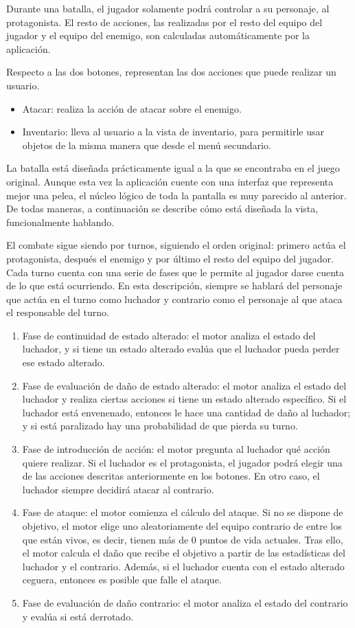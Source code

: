 Durante una batalla, el jugador solamente podrá controlar a su personaje, al protagonista. El resto de acciones, las realizadas por el resto del equipo del jugador y el equipo del enemigo, son calculadas automáticamente por la aplicación. 

Respecto a las dos botones, representan las dos acciones que puede realizar un usuario.
\begin{itemize}
	\item Atacar: realiza la acción de atacar sobre el enemigo.
	\item Inventario: lleva al usuario a la vista de inventario, para permitirle usar objetos de la misma manera que desde el menú secundario.
\end{itemize}

La batalla está diseñada prácticamente igual a la que se encontraba en el juego original. Aunque esta vez la aplicación cuente con una interfaz que representa mejor una pelea, el núcleo lógico de toda la pantalla es muy parecido al anterior. De todas maneras, a continuación se describe cómo está diseñada la vista, funcionalmente hablando. 

El combate sigue siendo por turnos, siguiendo el orden original: primero actúa el protagonista, después el enemigo y por último el resto del equipo del jugador. Cada turno cuenta con una serie de fases que le permite al jugador darse cuenta de lo que está ocurriendo. En esta descripción, siempre se hablará del personaje que actúa en el turno como luchador y contrario como el personaje al que ataca el responsable del turno.

\begin{enumerate}
	\item Fase de continuidad de estado alterado: el motor analiza el estado del luchador, y si tiene un estado alterado evalúa que el luchador pueda perder ese estado alterado.
	\item Fase de evaluación de daño de estado alterado: el motor analiza el estado del luchador y realiza ciertas acciones si tiene un estado alterado específico. Si el luchador está envenenado, entonces le hace una cantidad de daño al luchador; y si está paralizado hay una probabilidad de que pierda su turno.
	\item Fase de introducción de acción: el motor pregunta al luchador qué acción quiere realizar. Si el luchador es el protagonista, el jugador podrá elegir una de las acciones descritas anteriormente en los botones. En otro caso, el luchador siempre decidirá atacar al contrario.
	\item Fase de ataque: el motor comienza el cálculo del ataque. Si no se dispone de objetivo, el motor elige uno aleatoriamente del equipo contrario de entre los que están vivos, es decir, tienen más de 0 puntos de vida actuales. Tras ello, el motor calcula el daño que recibe el objetivo a partir de las estadísticas del luchador y el contrario.
	Además, si el luchador cuenta con el estado alterado ceguera, entonces es posible que falle el ataque.
	\item Fase de evaluación de daño contrario: el motor analiza el estado del contrario y evalúa si está derrotado.
\end{enumerate}

